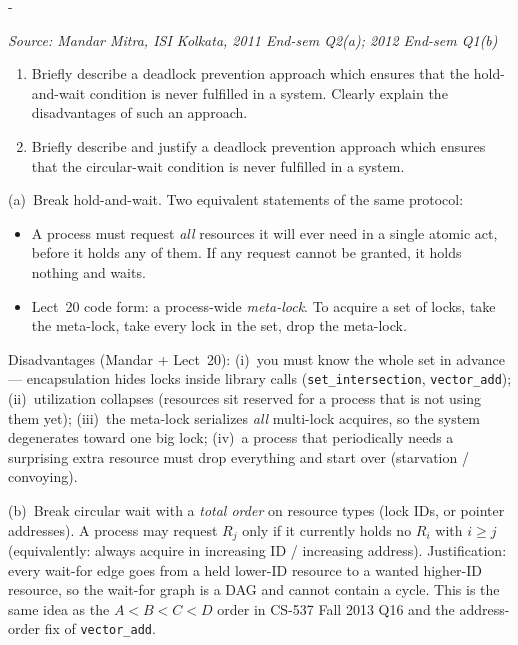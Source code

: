 \documentclass[11pt,a4paper]{article}
\makeatletter
\newcommand{\keepspace}[1]{\par\penalty-100\begingroup
  \setlength{\dimen@}{#1}\dimen@ii\pagegoal\advance\dimen@ii-\pagetotal
  \ifdim\dimen@>\dimen@ii\ifdim\dimen@ii>\z@\vfil\fi\break\fi\endgroup}
\newcounter{qn}[section]
\newenvironment{Qn}[4]{%
  \refstepcounter{qn}\keepspace{7\baselineskip}%
  \begin{tcolorbox}[qboxstyle, title={Q\thesection.\theqn\ \ [#1 \textbar\ #2]\ \ #4}]%
  {\footnotesize\color{g3}\textit{Source: #3}}\par\smallskip%
}{%
  \end{tcolorbox}%
}
\newenvironment{Sol}{%
  \begin{tcolorbox}[sboxstyle, title={Solution}]%
}{%
  \end{tcolorbox}\vspace{0.35em}%
}
\makeatother
\begin{document}
\begin{Qn}{Medium-Hard}{Lect 20}{Mandar Mitra, ISI Kolkata, 2011 End-sem Q2(a); 2012 End-sem Q1(b)}{Prevention by breaking hold-and-wait, and by breaking circular wait}
\begin{enumerate}
  \item[(a)] [2011 End Q2(a)] Briefly describe a deadlock prevention
        approach which ensures that the hold-and-wait condition is never
        fulfilled in a system. Clearly explain the disadvantages of such
        an approach.
  \item[(b)] [2012 End Q1(b)] Briefly describe and justify a deadlock
        prevention approach which ensures that the circular-wait
        condition is never fulfilled in a system.
\end{enumerate}
\end{Qn}
\begin{Sol}
(a)~Break hold-and-wait. Two equivalent statements of the same protocol:
\begin{itemize}
  \item A process must request \emph{all} resources it will ever need
        in a single atomic act, before it holds any of them. If any
        request cannot be granted, it holds nothing and waits.
  \item Lect~20 code form: a process-wide \emph{meta-lock}. To acquire
        a set of locks, take the meta-lock, take every lock in the set,
        drop the meta-lock.
\end{itemize}
Disadvantages (Mandar + Lect~20): (i)~you must know the whole set in
advance --- encapsulation hides locks inside library calls
(\texttt{set\_intersection}, \texttt{vector\_add}); (ii)~utilization
collapses (resources sit reserved for a process that is not using them
yet); (iii)~the meta-lock serializes \emph{all} multi-lock acquires, so
the system degenerates toward one big lock; (iv)~a process that
periodically needs a surprising extra resource must drop everything and
start over (starvation / convoying).

(b)~Break circular wait with a \emph{total order} on resource types
(lock IDs, or pointer addresses). A process may request $R_j$ only if
it currently holds no $R_i$ with $i \ge j$ (equivalently: always acquire
in increasing ID / increasing address). Justification: every wait-for
edge goes from a held lower-ID resource to a wanted higher-ID resource,
so the wait-for graph is a DAG and cannot contain a cycle. This is the
same idea as the $A < B < C < D$ order in CS-537 Fall 2013 Q16 and the
address-order fix of \texttt{vector\_add}.
\end{Sol}
\end{document}
